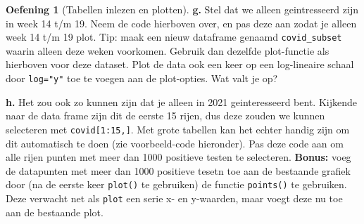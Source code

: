 \documentclass[
  a4paper,
]{scrbook}
\newenvironment{Shaded}{\begin{snugshade}}{\end{snugshade}}
\newcommand{\AttributeTok}[1]{\textcolor[rgb]{0.40,0.45,0.13}{#1}}
\newcommand{\CommentTok}[1]{\textcolor[rgb]{0.37,0.37,0.37}{#1}}
\newcommand{\DecValTok}[1]{\textcolor[rgb]{0.68,0.00,0.00}{#1}}
\newcommand{\FunctionTok}[1]{\textcolor[rgb]{0.28,0.35,0.67}{#1}}
\newcommand{\NormalTok}[1]{\textcolor[rgb]{0.00,0.23,0.31}{#1}}
\newcommand{\OtherTok}[1]{\textcolor[rgb]{0.00,0.23,0.31}{#1}}
\newcommand{\SpecialCharTok}[1]{\textcolor[rgb]{0.37,0.37,0.37}{#1}}
\newcommand{\StringTok}[1]{\textcolor[rgb]{0.13,0.47,0.30}{#1}}
\theoremstyle{definition}
\newtheorem{exercise}{Oefening}[chapter]
\theoremstyle{remark}
\begin{document}
\begin{exercise}[Tabellen inlezen en
plotten]
\textbf{g.} Stel dat we alleen geintresseerd zijn in week 14 t/m 19.
Neem de code hierboven over, en pas deze aan zodat je alleen week 14 t/m
19 plot. Tip: maak een nieuw dataframe genaamd \texttt{covid\_subset}
waarin alleen deze weken voorkomen. Gebruik dan dezelfde plot-functie
als hierboven voor deze dataset. Plot de data ook een keer op een
log-lineaire schaal door \texttt{log="y"} toe te voegen aan de
plot-opties. Wat valt je op?

\textbf{h.} Het zou ook zo kunnen zijn dat je alleen in 2021
geinteresseerd bent. Kijkende naar de data frame zijn dit de eerste 15
rijen, dus deze zouden we kunnen selecteren met
\texttt{covid{[}1:15,{]}}. Met grote tabellen kan het echter handig zijn
om dit automatisch te doen (zie voorbeeld-code hieronder). Pas deze code
aan om alle rijen punten met meer dan 1000 positieve testen te
selecteren. \textbf{Bonus:} voeg de datapunten met meer dan 1000
positieve tesetn toe aan de bestaande grafiek door (na de eerste keer
\texttt{plot()} te gebruiken) de functie \texttt{points()} te gebruiken.
Deze verwacht net als \texttt{plot} een serie x- en y-waarden, maar
voegt deze nu toe aan de bestaande plot.

\begin{Shaded}
\end{Shaded}

\end{exercise}
\end{document}

